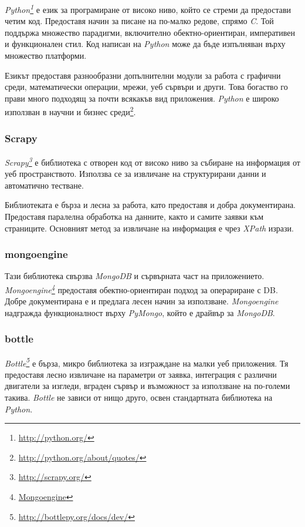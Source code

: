 		\emph{Python\footnote{\url{http://python.org/}}} е език за програмиране от високо ниво, който се стреми да предостави четим код. Предоставя начин за писане на по-малко редове, спрямо \emph{C}. Той поддържа множество парадигми, включително обектно-ориентиран, императивен и функционален стил. Код написан на \emph{Python} може да бъде изпълняван върху множество платформи. 
		
		Езикът предоставя разнообразни допълнителни модули за работа с графични среди, математически операции, мрежи, уеб сървъри и други. Това богаство го прави много подходящ за почти всякакъв вид приложения. \emph{Python} е широко използван в научни и бизнес среди\footnote{\url{http://python.org/about/quotes/}}.
		
		\subsubsection{Scrapy}

		\emph{Scrapy\footnote{\url{http://scrapy.org/}}} е библиотека с отворен код от високо ниво за събиране на информация от уеб пространството. Използва се за извличане на структурирани данни и автоматично тестване.
		
		Библиотеката е бърза и лесна за работа, като предоставя и добра документирана. Предоставя паралелна обработка на данните, както и самите заявки към страниците. Основният метод за извличане на информация е чрез \emph{XPath} изрази.
		
		\subsubsection{mongoengine}

		Тази библиотека свързва \emph{MongoDB} и сървърната част на приложението. \emph{Mongoengine\footnote{\url{Mongoengine}}} предоставя обектно-ориентиран подход за операриране с \ac{DB}. Добре документирана е и предлага лесен начин за използване. \emph{Mongoengine} надгражда функционалност върху \emph{PyMongo}, който е драйвър за \emph{MongoDB}.
		
		\subsubsection{bottle}

		\emph{Bottle\footnote{\url{http://bottlepy.org/docs/dev/}}} е бърза, микро библиотека за изграждане на малки уеб приложения. Тя предоставя лесно извличане на параметри от заявка, интеграция с различни двигатели за изгледи, вграден сървър и възможност за използване на по-големи такива. \emph{Bottle} не зависи от нищо друго, освен стандартната библиотека на \emph{Python}. 
		
